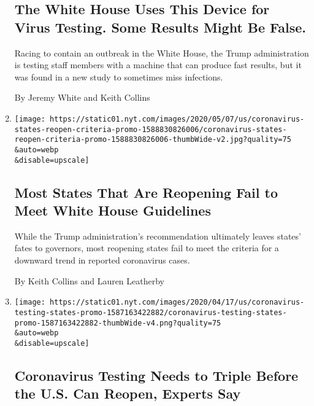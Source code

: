 \begin{enumerate}
{  \subsection{The White House Uses This Device for Virus Testing. Some
  Results Might Be
  False.}\label{the-white-house-uses-this-device-for-virus-testing-some-results-might-be-false}}

  Racing to contain an outbreak in the White House, the Trump
  administration is testing staff members with a machine that can
  produce fast results, but it was found in a new study to sometimes
  miss infections.

  By Jeremy White and Keith Collins
\item
  \href{/interactive/2020/05/07/us/coronavirus-states-reopen-criteria.html}{}

  \texttt{[image: https://static01.nyt.com/images/2020/05/07/us/coronavirus-states-reopen-criteria-promo-1588830826006/coronavirus-states-reopen-criteria-promo-1588830826006-thumbWide-v2.jpg?quality=75\\\&auto=webp\\\&disable=upscale]}

  \hypertarget{most-states-that-are-reopening-fail-to-meet-white-house-guidelines}{%
  \subsection{Most States That Are Reopening Fail to Meet White House
  Guidelines}\label{most-states-that-are-reopening-fail-to-meet-white-house-guidelines}}

  While the Trump administration's recommendation ultimately leaves
  states' fates to governors, most reopening states fail to meet the
  criteria for a downward trend in reported coronavirus cases.

  By Keith Collins and Lauren Leatherby
\item
  \href{/interactive/2020/04/17/us/coronavirus-testing-states.html}{}

  \texttt{[image: https://static01.nyt.com/images/2020/04/17/us/coronavirus-testing-states-promo-1587163422882/coronavirus-testing-states-promo-1587163422882-thumbWide-v4.png?quality=75\\\&auto=webp\\\&disable=upscale]}

  \hypertarget{coronavirus-testing-needs-to-triple-before-the-us-can-reopen-experts-say}{%
  \subsection{Coronavirus Testing Needs to Triple Before the U.S. Can
  Reopen, Experts
  Say}\label{coronavirus-testing-needs-to-triple-before-the-us-can-reopen-experts-say}}


\end{enumerate}
